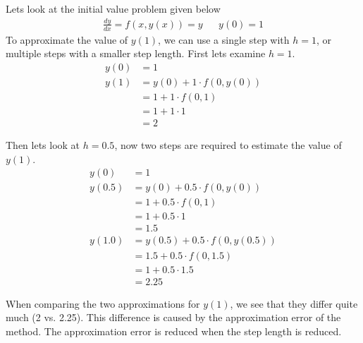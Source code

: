 Lets look at the initial value problem given below
\begin{align*}
\frac{dy}{dx} = f(x, y(x)) = y	&& y(0) = 1
\end{align*}
To approximate the value of $y(1)$, we can use a single
step with $h = 1$, or multiple steps with a smaller step
length.
First lets examine $h = 1$.
\begin{align*}
y(0) & = 1 \\
y(1) & = y(0) + 1 \cdot f(0, y(0)) \\
& = 1 + 1 \cdot f(0, 1) \\
& = 1 + 1 \cdot 1 \\
& = 2
\end{align*}

Then lets look at $h = 0.5$, now two steps are required to 
estimate the value of $y(1)$.
\begin{align*}
y(0) & = 1 \\
y(0.5) & = y(0) + 0.5 \cdot f(0, y(0)) \\
& = 1 + 0.5 \cdot f(0, 1) \\
& = 1 + 0.5 \cdot 1 \\
& = 1.5 \\
y(1.0) & = y(0.5) + 0.5 \cdot f(0, y(0.5)) \\
& = 1.5 + 0.5 \cdot f(0, 1.5) \\
& = 1 + 0.5 \cdot 1.5 \\
& = 2.25
\end{align*}

When comparing the two approximations for $y(1)$, 
we see that they differ quite much (2 vs. 2.25).
This difference is caused by the approximation error of the method.
The approximation error is reduced when the step length is reduced.


